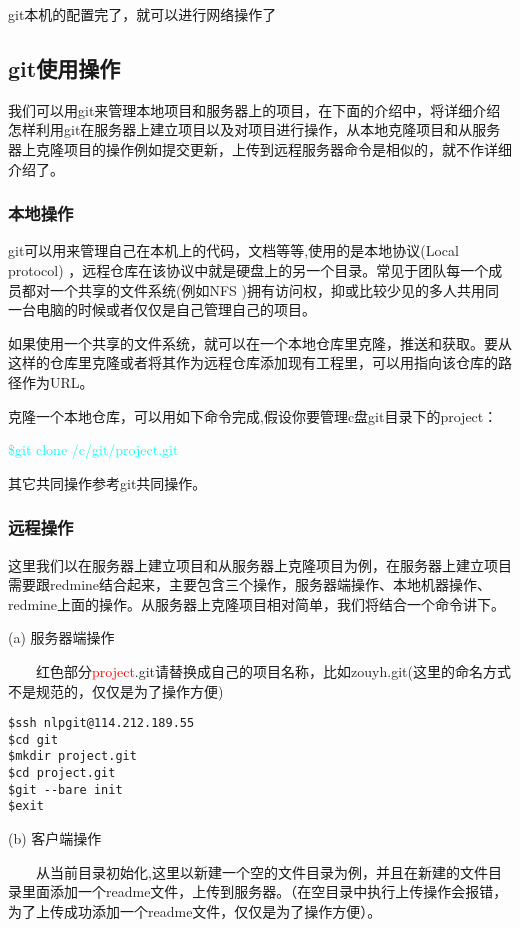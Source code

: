 git本机的配置完了，就可以进行网络操作了


\subsection{git使用操作}

我们可以用git来管理本地项目和服务器上的项目，在下面的介绍中，将详细介绍怎样利用git在服务器上建立项目以及对项目进行操作，从本地克隆项目和从服务器上克隆项目的操作例如提交更新，上传到远程服务器命令是相似的，就不作详细介绍了。

\subsubsection{本地操作}

git可以用来管理自己在本机上的代码，文档等等,使用的是本地协议(Local protocol) ，远程仓库在该协议中就是硬盘上的另一个目录。常见于团队每一个成员都对一个共享的文件系统(例如NFS )拥有访问权，抑或比较少见的多人共用同一台电脑的时候或者仅仅是自己管理自己的项目。

如果使用一个共享的文件系统，就可以在一个本地仓库里克隆，推送和获取。要从这样的仓库里克隆或者将其作为远程仓库添加现有工程里，可以用指向该仓库的路径作为URL。

克隆一个本地仓库，可以用如下命令完成,假设你要管理c盘git目录下的project：

\textcolor{cyan}{\$git clone /c/git/project.git}

其它共同操作参考git共同操作。

\subsubsection{远程操作}

这里我们以在服务器上建立项目和从服务器上克隆项目为例，在服务器上建立项目需要跟redmine结合起来，主要包含三个操作，服务器端操作、本地机器操作、redmine上面的操作。从服务器上克隆项目相对简单，我们将结合一个命令讲下。


(a) 服务器端操作

~~~~红色部分\textcolor{red}{project}.git请替换成自己的项目名称，比如zouyh.git(这里的命名方式不是规范的，仅仅是为了操作方便)
\begin{lstlisting}
$ssh nlpgit@114.212.189.55
$cd git
$mkdir project.git
$cd project.git
$git --bare init
$exit
\end{lstlisting}


(b) 客户端操作

~~~~从当前目录初始化,这里以新建一个空的文件目录为例，并且在新建的文件目录里面添加一个readme文件，上传到服务器。（在空目录中执行上传操作会报错，为了上传成功添加一个readme文件，仅仅是为了操作方便）。

